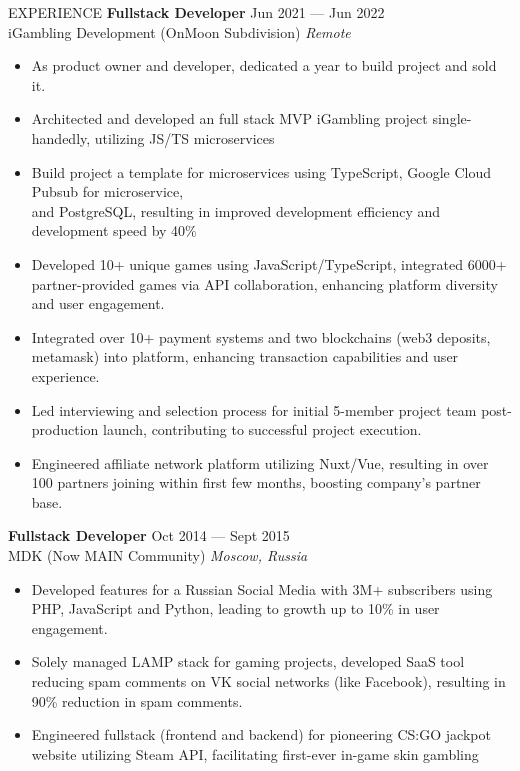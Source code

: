 \documentclass{template} %
\begin{document}
\begin{rSection}{EXPERIENCE}
\textbf{Fullstack Developer} \hfill Jun 2021 --- Jun 2022\\
iGambling Development (OnMoon Subdivision) \hfill \textit{Remote}
 \begin{itemize}
    \itemsep -3pt {} 
     \item As product owner and developer, dedicated a year to build project and sold it.
     \item Architected and developed an full stack MVP iGambling project single-handedly, utilizing JS/TS microservices
     \item Build project a template for microservices using TypeScript, Google Cloud Pubsub for microservice,\\and PostgreSQL, resulting in improved development efficiency and development speed by 40\%
     \item Developed 10+ unique games using JavaScript/TypeScript, integrated 6000+ partner-provided games via API collaboration, enhancing platform diversity and user engagement.
     \item Integrated over 10+ payment systems and two blockchains (web3 deposits, metamask) into platform, enhancing transaction capabilities and user experience.
     \item Led interviewing and selection process for initial 5-member project team post-production launch, contributing to successful project execution.
     \item Engineered affiliate network platform utilizing Nuxt/Vue, resulting in over 100 partners joining within first few months, boosting company's partner base.
 \end{itemize}
 \textbf{Fullstack Developer} \hfill Oct 2014 --- Sept 2015\\
MDK (Now MAIN Community) \hfill \textit{Moscow, Russia}
 \begin{itemize}
    \itemsep -3pt {} 
     \item Developed features for a Russian Social Media with 3M+ subscribers using PHP, JavaScript and Python, leading to growth up to 10\% in user engagement.
     \item Solely managed LAMP stack for gaming projects, developed SaaS tool reducing spam comments on VK social networks (like Facebook), resulting in 90\% reduction in spam comments.
     \item Engineered fullstack (frontend and backend) for pioneering CS:GO jackpot website utilizing Steam API, facilitating first-ever in-game skin gambling
 \end{itemize}


\end{rSection}
\end{document}
